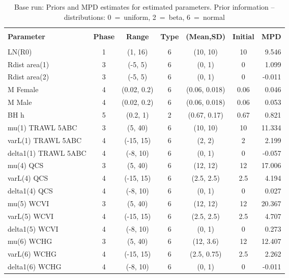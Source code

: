 \setlength{\tabcolsep}{2pt}
\begin{table}[!h]
\centering
\caption{Base run: Priors and MPD estimates for estimated parameters. Prior information -- distributions: 0~=~uniform, 2~=~beta, 6~=~normal}
\label{tab:pop.parest}
\usefont{\encodingdefault}{\familydefault}{\seriesdefault}{\shapedefault}\small
\begin{tabular}{lcccccr}
\hline \\ [-1.5ex]
{\bf Parameter} & {\bf Phase} & {\bf Range} & {\bf Type} & {\bf (Mean,SD)} & {\bf Initial} & {\bf MPD} \\ [1ex]
\hline \\ [-1.5ex]
LN(R0) & 1 & (1, 16) & 6 & (10, 10) & 10 & 9.546 \\
Rdist area(1) & 3 & (-5, 5) & 6 & (0, 1) & 0 & 1.099 \\
Rdist area(2) & 3 & (-5, 5) & 6 & (0, 1) & 0 & -0.011 \\
M Female & 4 & (0.02, 0.2) & 6 & (0.06, 0.018) & 0.06 & 0.046 \\
M Male & 4 & (0.02, 0.2) & 6 & (0.06, 0.018) & 0.06 & 0.053 \\
BH h & 5 & (0.2, 1) & 2 & (0.67, 0.17) & 0.67 & 0.821 \\
mu(1) TRAWL 5ABC & 3 & (5, 40) & 6 & (10, 10) & 10 & 11.334 \\
varL(1) TRAWL 5ABC & 4 & (-15, 15) & 6 & (2, 2) & 2 & 2.199 \\
delta1(1) TRAWL 5ABC & 4 & (-8, 10) & 6 & (0, 1) & 0 & -0.057 \\
mu(4) QCS & 3 & (5, 40) & 6 & (12, 12) & 12 & 17.006 \\
varL(4) QCS & 4 & (-15, 15) & 6 & (2.5, 2.5) & 2.5 & 4.194 \\
delta1(4) QCS & 4 & (-8, 10) & 6 & (0, 1) & 0 & 0.027 \\
mu(5) WCVI & 3 & (5, 40) & 6 & (12, 12) & 12 & 20.367 \\
varL(5) WCVI & 4 & (-15, 15) & 6 & (2.5, 2.5) & 2.5 & 4.707 \\
delta1(5) WCVI & 4 & (-8, 10) & 6 & (0, 1) & 0 & 0.273 \\
mu(6) WCHG & 3 & (5, 40) & 6 & (12, 3.6) & 12 & 12.407 \\
varL(6) WCHG & 4 & (-15, 15) & 6 & (2.5, 0.75) & 2.5 & 2.262 \\
delta1(6) WCHG & 4 & (-8, 10) & 6 & (0, 1) & 0 & -0.011 \\

\end{tabular}
\end{table}
